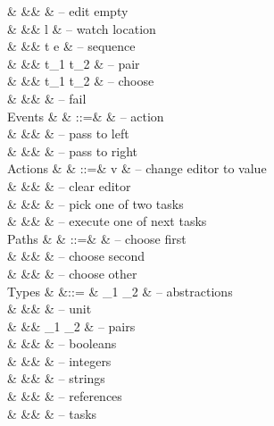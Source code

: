 \begin{grammar}
    &        &\mid& \Empty \tau                 & – edit empty \\
    &        &\mid& \Watch l                    & – watch location \\
    &        &\mid& t \Seq e                    & – sequence \\
    &        &\mid& t_1 \And t_2                & – pair \\
    &        &\mid& t_1 \Or t_2                 & – choose \\
    &        &\mid& \Fail                       & – fail \\
  Events
    & \eta   & ::=& \alpha                      & – action \\
    &        &\mid& \Left \eta                  & – pass to left \\
    &        &\mid& \Right \eta                 & – pass to right \\
  Actions
    & \alpha & ::=& v                           & – change editor to value \\
    &        &\mid& \Clear                      & – clear editor \\
    &        &\mid& \Pick \pi                   & – pick one of two tasks \\
    &        &\mid& \Execute \pi                & – execute one of next tasks \\
  Paths
    & \pi    & ::=& \First                      & – choose first \\
    &        &\mid& \Second                     & – choose second \\
    &        &\mid& \Other \pi                  & – choose other \\
  Types
    & \tau   &::= & \tau_1 \to \tau_2           & – abstractions \\
    &        &\mid& \Unit                       & – unit \\
    &        &\mid& \tau_1 \times \tau_2        & – pairs \\
    &        &\mid& \Bool                       & – booleans \\
    &        &\mid& \Int                        & – integers \\
    &        &\mid& \String                     & – strings \\
    &        &\mid& \Reference \tau             & – references \\
    &        &\mid& \Task \tau                  & – tasks \\
\end{grammar}


